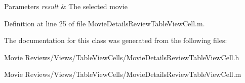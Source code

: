 \begin{DoxyParams}{Parameters}
{\em result} & The selected movie \\
\hline
\end{DoxyParams}


Definition at line 25 of file Movie\+Details\+Review\+Table\+View\+Cell.\+m.



The documentation for this class was generated from the following files\+:\begin{DoxyCompactItemize}
\item 
Movie Reviews/\+Views/\+Table\+View\+Cells/Movie\+Details\+Review\+Table\+View\+Cell.\+h\item 
Movie Reviews/\+Views/\+Table\+View\+Cells/Movie\+Details\+Review\+Table\+View\+Cell.\+m\end{DoxyCompactItemize}
